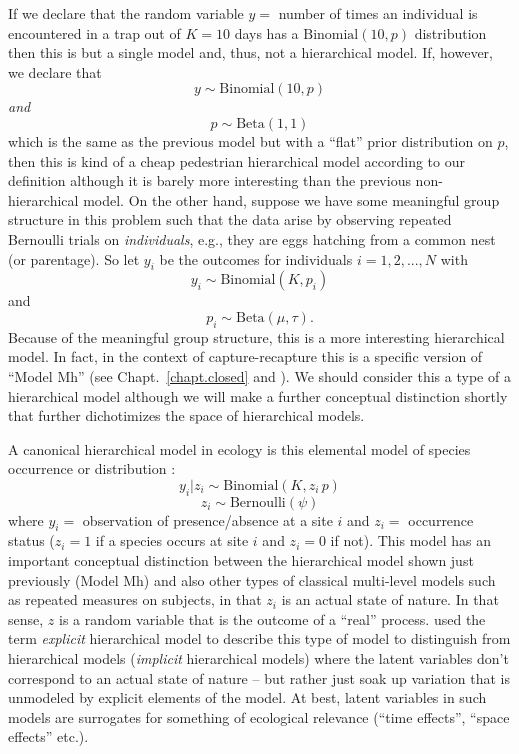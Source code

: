 If we declare that the random variable $y = $ number of times an
individual is encountered in a trap out of $K=10$ days has a
$\mbox{Binomial}(10, p)$ distribution then this is but a single model and,
thus, not a hierarchical model. If, however, we declare that
\[
y \sim \mbox{Binomial}(10,p)
\]
{\it and}
\[
p \sim \mbox{Beta}(1,1)
\]
which is the same as the previous model but with a ``flat'' prior
distribution on $p$, then this is kind of a cheap pedestrian
hierarchical model according to our definition although it is barely
more interesting than the previous non-hierarchical model.
On the
other hand, suppose we have some meaningful group structure in this
problem such that the data arise by observing repeated Bernoulli
trials on {\it individuals}, e.g., they are eggs hatching from a
common nest (or parentage). So let $y_{i}$ be the outcomes for
individuals $i=1,2,...,N$ with
\[
y_{i} \sim \mbox{Binomial}(K, p_{i})
\]
 and
\[
p_{i}\sim \mbox{Beta}(\mu, \tau).
\]
Because of the meaningful group structure, this is a more interesting
hierarchical model. In fact, in the context of capture-recapture this
is a specific version of ``Model Mh'' (see Chapt.~\ref{chapt.closed} and
\citet{dorazio_royle:2003}).  We should consider this a type of a
hierarchical model although we will make a further conceptual
distinction shortly that further dichotimizes the space of
hierarchical models.

A canonical hierarchical model in ecology is this
elemental model of species occurrence or distribution
\citep{mackenzie_etal:2002, tyre_etal:2003, kery:2011}:
\[
y_{i}|z_{i} \sim \mbox{Binomial}(K,z_{i} \,  p)
\]
\[
z_{i} \sim \mbox{Bernoulli}(\psi)
\]
where  $y_{i} = $ observation of presence/absence at a site $i$ and
$z_{i} = $ occurrence status ($z_{i}=1$ if a species occurs at  site
$i$ and $z_{i}=0$ if not).  This model has an important conceptual
distinction between the hierarchical model shown just previously
(Model Mh) and also other types of classical multi-level models such
as repeated measures on subjects, in that $z_{i}$ is an actual state
of nature. In that sense, $z$ is a random variable that is the outcome of a
``real'' process.   \citet{royle_dorazio:2008} used the term {\it
  explicit} hierarchical model to describe this type of model to
distinguish from hierarchical models ({\it implicit} hierarchical
models) where the latent variables don't
correspond to an actual state of nature -- but rather just soak up
variation that is unmodeled by explicit elements of the model.
At best, latent variables in such models
are surrogates for something of ecological relevance
(``time effects'', ``space effects'' etc.).


